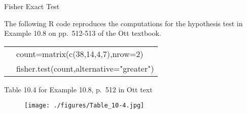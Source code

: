 \documentclass[12pt,ignorenonframetext,aspectratio=169]{beamer}
\begin{document}
\begin{frame}{Fisher Exact Test}

The following R code reproduces the computations for the hypothesis test
in Example 10.8 on pp.~512-513 of the Ott textbook.

\begin{table}
\centering
\begin{tabular}{ll}
\hspace{3em} & count=matrix(c(38,14,4,7),nrow=2) \\
\hspace{3em} & fisher.test(count,alternative="greater") \\
\end{tabular}
\end{table}


\end{frame}

\begin{frame}{Table 10.4 for Example 10.8, p.~512 in Ott text}

\begin{figure}[htbp]
\centering
\texttt{[image: ./figures/Table\_10-4.jpg]}
\caption{}
\end{figure}

\note{}

\end{frame}
\end{document}
